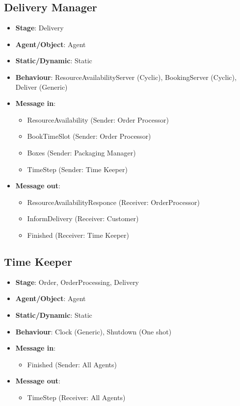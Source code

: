 \documentclass[12pt]{article}
\begin{document}
\subsection{Delivery Manager}%
\label{sub:delivery_manager}
\begin{itemize}
    \item \textbf{Stage}: Delivery
    \item \textbf{Agent/Object}: Agent
    \item \textbf{Static/Dynamic}: Static
    \item \textbf{Behaviour}: ResourceAvailabilityServer (Cyclic), BookingServer (Cyclic), Deliver (Generic)
    \item \textbf{Message in}:
        \begin{itemize}
            \item ResourceAvailability (Sender: Order Processor)
            \item BookTimeSlot (Sender: Order Processor)
            \item Boxes (Sender: Packaging Manager)
            \item TimeStep (Sender: Time Keeper)
        \end{itemize}
    \item \textbf{Message out}:
        \begin{itemize}
            \item ResourceAvailabilityResponce (Receiver: OrderProcessor)
            \item InformDelivery (Receiver: Customer)
            \item Finished (Receiver: Time Keeper)
        \end{itemize}
\end{itemize}

\subsection{Time Keeper}%
\label{sub:time_keeper}
\begin{itemize}
    \item \textbf{Stage}: Order, OrderProcessing, Delivery
    \item \textbf{Agent/Object}: Agent
    \item \textbf{Static/Dynamic}: Static
    \item \textbf{Behaviour}: Clock (Generic), Shutdown (One shot)
    \item \textbf{Message in}:
        \begin{itemize}
            \item Finished (Sender: All Agents)
        \end{itemize}
    \item \textbf{Message out}:
        \begin{itemize}
            \item TimeStep (Receiver: All Agents)
        \end{itemize}
\end{itemize}
\end{document}

